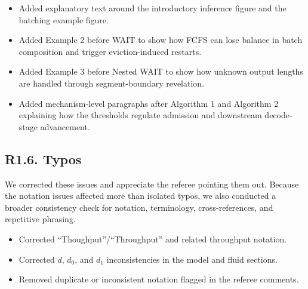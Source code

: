 \changes
\begin{itemize}
    \item Added explanatory text around the introductory inference figure and the batching example figure.
    \item Added Example 2 before WAIT to show how FCFS can lose balance in batch composition and trigger eviction-induced restarts.
    \item Added Example 3 before Nested WAIT to show how unknown output lengths are handled through segment-boundary revelation.
    \item Added mechanism-level paragraphs after Algorithm 1 and Algorithm 2 explaining how the thresholds regulate admission and downstream decode-stage advancement.
\end{itemize}

\subsection*{R1.6. Typos}


\response We corrected these issues and appreciate the referee pointing them out. Because the notation issues affected more than isolated typos, we also conducted a broader consistency check for notation, terminology, cross-references, and repetitive phrasing.

\changes
\begin{itemize}
    \item Corrected ``Thoughput''/``Throughput'' and related throughput notation.
    \item Corrected \(d\), \(d_0\), and \(d_1\) inconsistencies in the model and fluid sections.
    \item Removed duplicate or inconsistent notation flagged in the referee comments.
\end{itemize}
